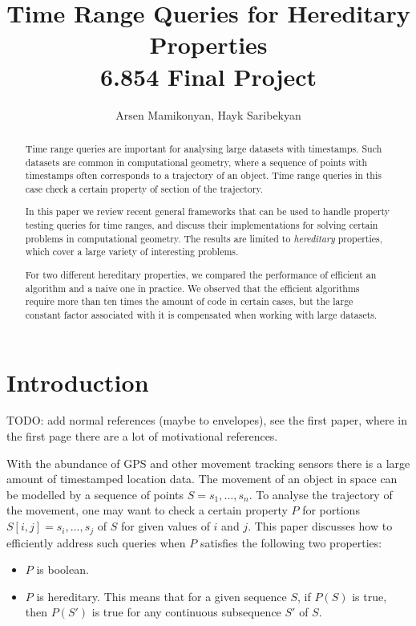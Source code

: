 \documentclass{article}
\begin{document}
\title{Time Range Queries for Hereditary Properties \\ \large 6.854 Final Project}
\author{Arsen Mamikonyan, Hayk Saribekyan}

\maketitle

\begin{abstract}
    Time range queries are important for analysing large datasets with timestamps. Such datasets are common in computational geometry, where a sequence of points with timestamps often corresponds to a trajectory of an object. Time range queries in this case check a certain property of section of the trajectory.
    
    In this paper we review recent general frameworks that can be used to handle property testing queries for time ranges, and discuss their implementations for solving certain problems in computational geometry. The results are limited to \textit{hereditary} properties, which cover a large variety of interesting problems.
    
    For two different hereditary properties, we compared the performance of efficient an algorithm and a naive one in practice. We observed that the efficient algorithms require more than ten times the amount of code in certain cases, but the large constant factor associated with it is compensated when working with large datasets.
\end{abstract}

\section{Introduction}
\label{sec:intro}

TODO: add normal references (maybe to envelopes), see the first paper, where in the first page there are a lot of motivational references.

With the abundance of GPS and other movement tracking sensors there is a large amount of timestamped location data. The movement of an object in space can be modelled by a sequence of points $S = s_1, \dots, s_n$. To analyse the trajectory of the movement, one may want to check a certain property $P$ for portions $S[i, j] = s_i, \dots, s_j$ of $S$ for given values of $i$ and $j$. This paper discusses how to efficiently address such queries when $P$ satisfies the following two properties:
\begin{itemize}
    \item $P$ is boolean.
    \item $P$ is hereditary. This means that for a given sequence $S$, if $P(S)$ is true, then $P(S')$ is true for any continuous subsequence $S'$ of $S$.
\end{itemize}
\end{document}
